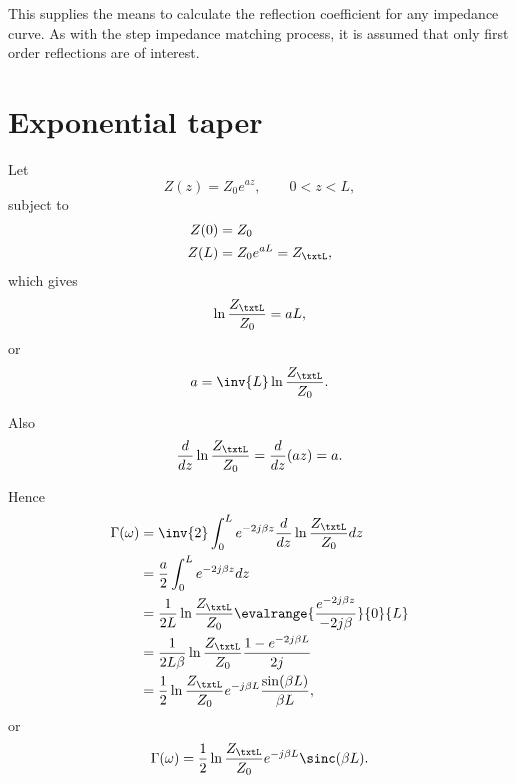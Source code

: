 This supplies the means to calculate the reflection coefficient for any impedance curve.  As with the step impedance matching process, it is assumed that only first order reflections are of interest.

\section{Exponential taper}
Let
\begin{equation}\label{eqn:continuumAndOtherTransformersCore:620}
Z(z) = Z_0 e^{a z}, \qquad 0 < z < L,
\end{equation}
subject to
\begin{equation}\label{eqn:continuumAndOtherTransformersCore:640}
\begin{aligned}
Z(0) &= Z_0 \\
Z(L) &= Z_0 e^{a L} = Z_\txtL,
\end{aligned}
\end{equation}
which gives
\begin{equation}\label{eqn:continuumAndOtherTransformersCore:660}
\ln \frac{Z_\txtL}{Z_0} = a L,
\end{equation}
or
\begin{equation}\label{eqn:continuumAndOtherTransformersCore:680}
a = \inv{L} \ln \frac{Z_\txtL}{Z_0}.
\end{equation}

Also
\begin{equation}\label{eqn:continuumAndOtherTransformersCore:700}
\frac{d}{dz} \ln \frac{Z_\txtL}{Z_0}
= \frac{d}{dz} (az)
= a.
\end{equation}

Hence
\begin{equation}\label{eqn:continuumAndOtherTransformersCore:740}
\begin{aligned}
\Gamma(\omega)
&= \inv{2} \int_0^L e^{-2 j \beta z} \frac{d}{dz} \ln \frac{Z_\txtL}{Z_0} dz
\\ &= \frac{a}{2}
\int_0^L e^{-2 j \beta z} dz
\\ &= \frac{1}{2L} \ln \frac{Z_\txtL}{Z_0}
\evalrange{ \frac{e^{-2 j \beta z} }{ -2 j \beta} }{0}{L}
\\ &= \frac{1}{2L \beta} \ln \frac{Z_\txtL}{Z_0}
\frac{ 1 - e^{-2 j \beta L} }{2 j}
\\ &= \frac{1}{2} \ln \frac{Z_\txtL}{Z_0} e^{-j \beta L} \frac{\sin( \beta L )}{\beta L},
\end{aligned}
\end{equation}
or
\begin{equation}\label{eqn:continuumAndOtherTransformersCore:940}
\Gamma(\omega) = \frac{1}{2} \ln \frac{Z_\txtL}{Z_0} e^{-j \beta L} \sinc( \beta L ).
\end{equation}

